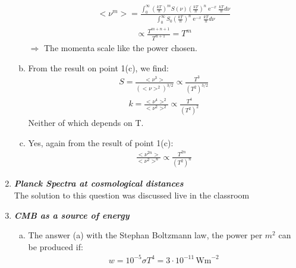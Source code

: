 \documentclass[a4paper,12pt]{article}
\newcommand{\question}[1]{\textbf{\textit{#1}}}
\DeclareMathOperator{\e}{e}
\newcommand{\intzinf}{\int_0^\infty}
\newcommand{\emx}{\ensuremath{\e^{-x}}}
\begin{document}
\begin{enumerate}
\begin{enumerate}[(a)]
\begin{align}
		\end{align}
		\begin{align}
		<\nu^m>=\frac{\intzinf\left(\frac{kT}{h}\right)^mS(\nu) \left(\frac{kT}{h}\right)^n\emx \frac{kT}{h}d\nu}{\intzinf S_0\left(\frac{kT}{h}\right)^n\emx \frac{kT}{h}d\nu}
		\end{align}
		\begin{align}
		\propto \frac{T^{m+n+1}}{T^{n+1}} = T^m
		\end{align}
		$\Rightarrow$ The momenta scale like the power chosen.
	\item
		From the result on point 1(c), we  find:
		\begin{align}
		S=\frac{< \nu^3>}{(<\nu>^2)^{3/2}}\propto \frac{T^3}{(T^2)^{3/2}}
		\end{align}
		\begin{align}
		k=\frac{<\nu^4>^2}{<\nu^2>^2}\propto \frac{T^4}{(T^2)^2}
		\end{align}
		Neither of which depends on T.
		\item Yes, again from the result of point 1(c):
		\begin{align}
		\frac{<\nu^{2n}>}{< \nu^2>^n}\propto \frac{T^{2n}}{(T^2)^n}
		\end{align}
		\end{enumerate}
	\item \question{Planck Spectra at cosmological distances}\\
	The solution to this question was discussed live in the classroom
	\item \question{CMB as a source of energy}
		\begin{enumerate}[(a)]
			\item The answer (a) with the Stephan Boltzmann law, the power per $m^2$ can be produced if:
			\begin{align}
			w=10^{-5}\sigma T^4=3\cdot 10^{-11} \,\textrm{Wm}^{-2}
			\end{align}
		\end{enumerate}
	\end{enumerate}
	
\end{document}
